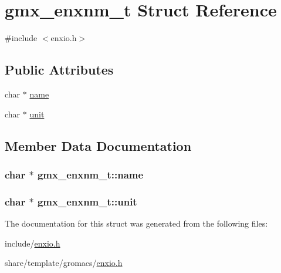 \hypertarget{structgmx__enxnm__t}{\section{gmx\-\_\-enxnm\-\_\-t \-Struct \-Reference}
\label{structgmx__enxnm__t}
}


{\ttfamily \#include $<$enxio.\-h$>$}

\subsection*{\-Public \-Attributes}
\begin{DoxyCompactItemize}
\item 
char $\ast$ \hyperlink{structgmx__enxnm__t_af5372dfb3ae799fa9153c009d083c545}{name}
\item 
char $\ast$ \hyperlink{structgmx__enxnm__t_a215a792d772c714959d469876bfeba22}{unit}
\end{DoxyCompactItemize}


\subsection{\-Member \-Data \-Documentation}
\hypertarget{structgmx__enxnm__t_af5372dfb3ae799fa9153c009d083c545}{
\subsubsection[{name}]{\setlength{\rightskip}{0pt plus 5cm}char $\ast$ {\bf gmx\-\_\-enxnm\-\_\-t\-::name}}}\label{structgmx__enxnm__t_af5372dfb3ae799fa9153c009d083c545}
\hypertarget{structgmx__enxnm__t_a215a792d772c714959d469876bfeba22}{
\subsubsection[{unit}]{\setlength{\rightskip}{0pt plus 5cm}char $\ast$ {\bf gmx\-\_\-enxnm\-\_\-t\-::unit}}}\label{structgmx__enxnm__t_a215a792d772c714959d469876bfeba22}


\-The documentation for this struct was generated from the following files\-:\begin{DoxyCompactItemize}
\item 
include/\hyperlink{include_2enxio_8h}{enxio.\-h}\item 
share/template/gromacs/\hyperlink{share_2template_2gromacs_2enxio_8h}{enxio.\-h}\end{DoxyCompactItemize}
